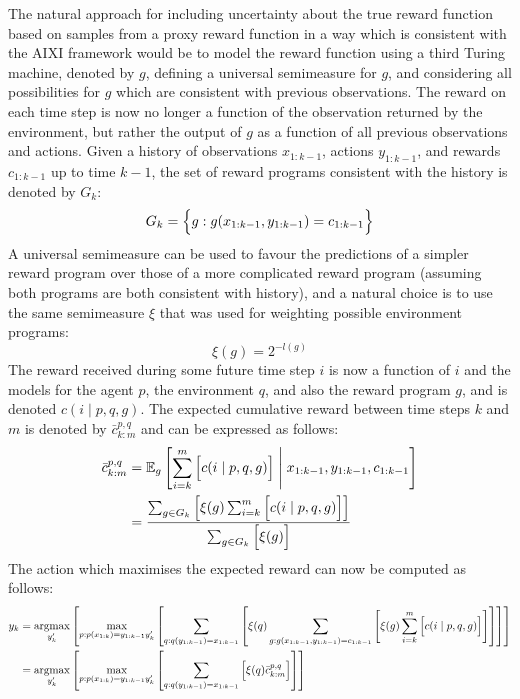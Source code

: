 The natural approach for including uncertainty about the true reward function based on samples from a proxy reward function in a way which is consistent with the AIXI framework would be to model the reward function using a third Turing machine, denoted by $g$, defining a universal semimeasure for $g$, and considering all possibilities for $g$ which are consistent with previous observations. The reward on each time step is now no longer a function of the observation returned by the environment, but rather the output of $g$ as a function of all previous observations and actions. Given a history of observations $x_{1:k-1}$, actions $y_{1:k-1}$, and rewards $c_{1:k-1}$ up to time $k-1$, the set of reward programs consistent with the history is denoted by $G_k$:
\begin{equation*}
    G_k = \Bigl\{ g:g(x_{1:k-1}, y_{1:k-1}) = c_{1:k-1} \Bigr\}
\end{equation*}
A universal semimeasure can be used to favour the predictions of a simpler reward program over those of a more complicated reward program (assuming both programs are both consistent with history), and a natural choice is to use the same semimeasure $\xi$ that was used for weighting possible environment programs:
\begin{equation*}
    \xi(g) = 2^{-l(g)}
\end{equation*}
The reward received during some future time step $i$ is now a function of $i$ and the models for the agent $p$, the environment $q$, and also the reward program $g$, and is denoted $c(i\mid p, q, g)$. The expected cumulative reward between time steps $k$ and $m$ is denoted by $\bar{c}_{k:m}^{p,q}$ and can be expressed as follows:
\begin{align*}
    \bar{c}_{k:m}^{p,q} &= \mathbb{E}_g\left[ \sum_{i=k}^{m}{\Bigl[ c(i \mid p, q, g) \Bigr]} \;\middle\vert\; x_{1:k-1}, y_{1:k-1}, c_{1:k-1} \right] \\
    &= \frac{\sum_{g\in G_k}{\left[ \xi(g) \sum_{i=k}^{m}{\Bigl[ c(i \mid p, q, g) \Bigr]} \right]}}{\sum_{g\in G_k}{\Bigl[ \xi(g) \Bigr]}}
\end{align*}
The action which maximises the expected reward can now be computed as follows:
\begin{align*}
    y_k &= \underset{y_k'}{\operatorname{argmax}}\left[ \max_{p:p(x_{1:k})=y_{1:k-1}y_k'}\left[ \sum_{q:q(y_{1:k-1})=x_{1:k-1}}{\left[ \xi(q) \sum_{g:g(x_{1:k-1}, y_{1:k-1}) = c_{1:k-1}}{\left[ \xi(g) \sum_{i=k}^{m}{\Bigl[ c(i \mid p, q, g) \Bigr]} \right]} \right]} \right] \right] \\
    &= \underset{y_k'}{\operatorname{argmax}}\left[ \max_{p:p(x_{1:k})=y_{1:k-1}y_k'}\left[ \sum_{q:q(y_{1:k-1})=x_{1:k-1}}{\Bigl[ \xi(q) \bar{c}_{k:m}^{p,q} \Bigr]} \right] \right]
\end{align*}
